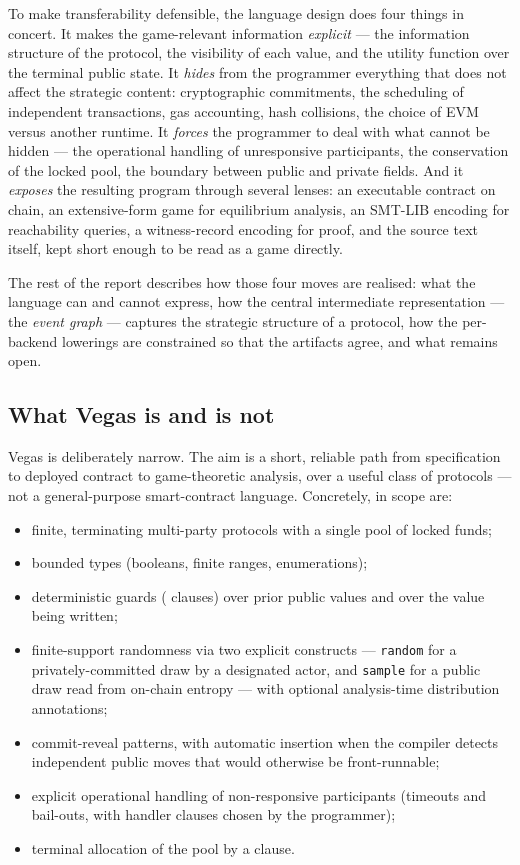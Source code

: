 To make transferability defensible, the language design does
four things in concert.  It makes the game-relevant information
\emph{explicit} --- the information structure of the protocol,
the visibility of each value, and the utility function over the
terminal public state.  It \emph{hides} from the programmer
everything that does not affect the strategic content:
cryptographic commitments, the scheduling of independent
transactions, gas accounting, hash collisions, the choice of
EVM versus another runtime.  It \emph{forces} the programmer to
deal with what cannot be hidden --- the operational handling of
unresponsive participants, the conservation of the locked pool,
the boundary between public and private fields.  And it \emph{exposes} the resulting program through several
lenses: an executable contract on chain, an extensive-form game
for equilibrium analysis, an SMT-LIB encoding for reachability
queries, a witness-record encoding for proof, and the source
text itself, kept short enough to be read as a game directly.

The rest of the report describes how those four moves are
realised: what the language can and cannot express, how the
central intermediate representation --- the \emph{event graph}
--- captures the strategic structure of a protocol, how the
per-backend lowerings are constrained so that the artifacts
agree, and what remains open.

\subsection{What Vegas is and is not}

Vegas is deliberately narrow.  The aim is a short, reliable
path from specification to deployed contract to game-theoretic
analysis, over a useful class of protocols --- not a
general-purpose smart-contract language.  Concretely, in scope
are:

\begin{itemize}\itemsep1pt
\item finite, terminating multi-party protocols with a single
  pool of locked funds;
\item bounded types (booleans, finite ranges, enumerations);
\item deterministic guards ( clauses) over prior public
  values and over the value being written;
\item finite-support randomness via two explicit constructs ---
  \texttt{random} for a privately-committed draw by a designated
  actor, and \texttt{sample} for a public draw read from on-chain
  entropy --- with optional analysis-time distribution
  annotations;
\item commit-reveal patterns, with automatic insertion when the
  compiler detects independent public moves that would otherwise
  be front-runnable;
\item explicit operational handling of non-responsive participants
  (timeouts and bail-outs, with handler clauses chosen by the
  programmer);
\item terminal allocation of the pool by a  clause.
\end{itemize}

